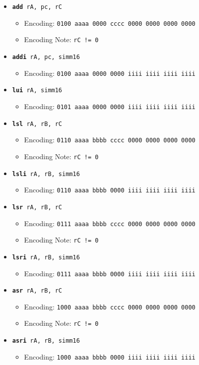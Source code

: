 \documentclass{article}
\begin{document}
\begin{itemize}
		\item \texttt{\textbf{add} rA, pc, rC}
		\begin{itemize}
			\item Encoding: 
				\texttt{0100 aaaa 0000 cccc  0000 0000 0000 0000}
			\item Encoding Note:  \texttt{rC != 0}
		\end{itemize}
		\item \texttt{\textbf{addi} rA, pc, simm16}
		\begin{itemize}
			\item Encoding: 
				\texttt{0100 aaaa 0000 0000  iiii iiii iiii iiii}
		\end{itemize}

		\item \texttt{\textbf{lui} rA, simm16}
		\begin{itemize}
			\item Encoding: 
				\texttt{0101 aaaa 0000 0000  iiii iiii iiii iiii}
		\end{itemize}

		\item \texttt{\textbf{lsl} rA, rB, rC}
		\begin{itemize}
			\item Encoding: 
				\texttt{0110 aaaa bbbb cccc  0000 0000 0000 0000}
			\item Encoding Note:  \texttt{rC != 0}
		\end{itemize}
		\item \texttt{\textbf{lsli} rA, rB, simm16}
		\begin{itemize}
			\item Encoding: 
				\texttt{0110 aaaa bbbb 0000  iiii iiii iiii iiii}
		\end{itemize}

		\item \texttt{\textbf{lsr} rA, rB, rC}
		\begin{itemize}
			\item Encoding: 
				\texttt{0111 aaaa bbbb cccc  0000 0000 0000 0000}
			\item Encoding Note:  \texttt{rC != 0}
		\end{itemize}
		\item \texttt{\textbf{lsri} rA, rB, simm16}
		\begin{itemize}
			\item Encoding: 
				\texttt{0111 aaaa bbbb 0000  iiii iiii iiii iiii}
		\end{itemize}

		\item \texttt{\textbf{asr} rA, rB, rC}
		\begin{itemize}
			\item Encoding: 
				\texttt{1000 aaaa bbbb cccc  0000 0000 0000 0000}
			\item Encoding Note:  \texttt{rC != 0}
		\end{itemize}
		\item \texttt{\textbf{asri} rA, rB, simm16}
		\begin{itemize}
			\item Encoding: 
				\texttt{1000 aaaa bbbb 0000  iiii iiii iiii iiii}
		\end{itemize}



\end{itemize}
\end{document}
